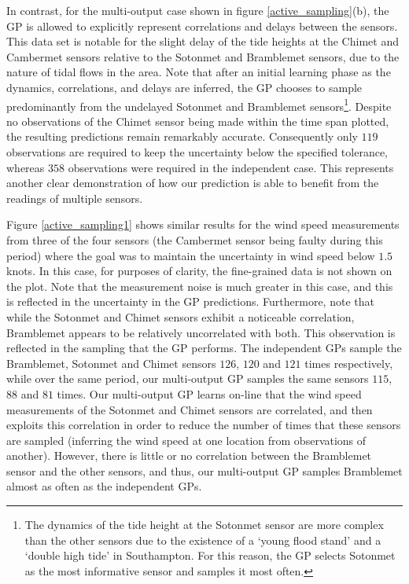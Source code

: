 \documentclass{acmtrans2m}
\begin{document}
In contrast, for the multi-output case shown in figure \ref{active_sampling}(b), the GP is allowed to explicitly represent correlations and delays between the sensors. This data set is notable for the slight delay of the tide heights at the Chimet and Cambermet sensors relative to the Sotonmet and Bramblemet sensors, due to the nature of tidal flows in the area. Note that after an initial learning phase as the dynamics, correlations, and delays are inferred, the GP chooses to sample predominantly from the undelayed Sotonmet and Bramblemet sensors\footnote{The dynamics of the tide height at the Sotonmet sensor are more complex than the other sensors due to the existence of a `young flood stand' and a `double high tide' in Southampton. For this reason, the GP selects Sotonmet as the most informative sensor and samples it most often.}. Despite no observations of the Chimet sensor being made within the time span plotted, the resulting predictions remain remarkably accurate. Consequently only $119$ observations are required to keep the uncertainty below the specified tolerance, whereas $358$ observations were required in the independent case. This represents another clear demonstration of how our prediction is able to benefit from the readings of multiple sensors.

Figure \ref{active_sampling1} shows similar results for the wind speed measurements from three of the four sensors (the Cambermet sensor being faulty during this period) where the goal was to maintain the uncertainty in wind speed below $1.5$ knots. In this case, for purposes of clarity, the fine-grained data is not shown on the plot. Note that the measurement noise is much greater in this case, and this is reflected in the uncertainty in the GP predictions. Furthermore, note that while the Sotonmet and Chimet sensors exhibit a noticeable correlation, Bramblemet appears to be relatively uncorrelated with both. This observation is reflected in the sampling that the GP performs. The independent GPs sample the Bramblemet, Sotonmet and Chimet sensors $126$, $120$ and $121$ times respectively, while over the same period, our multi-output GP samples the same sensors $115$, $88$ and $81$ times. Our multi-output GP learns on-line that the wind speed measurements of the Sotonmet and Chimet sensors are correlated, and then exploits this correlation in order to reduce the number of times that these sensors are sampled (inferring the wind speed at one location from observations of another). However, there is little or no correlation between the Bramblemet sensor and the other sensors, and thus, our multi-output GP samples Bramblemet almost as often as the independent GPs.
\end{document}
